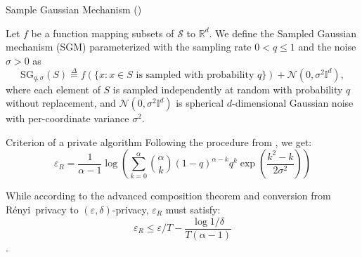 \documentclass{beamer}
\newcommand{\eqdef}{\stackrel{\Delta}{=}}
\newcommand{\SG}{\mathrm{SG}}
\newcommand{\renyi}{R\'enyi}
\newcommand{\eps}{\varepsilon}
\begin{document}
\begin{frame}{Sample Gaussian Mechanism (\cite{mironov2019SGM})}
    \begin{definition} Let $f$ be a function mapping subsets of $\mathcal{S}$ to $\mathbb{R}^d$. We define the Sampled Gaussian mechanism (SGM) parameterized with the sampling rate $0<q\leq 1$ and the noise $\sigma>0$ as
        \[
        \SG_{q,\sigma}(S)\eqdef f(\{x\colon x\in S \textrm{ is sampled with probability } q\})+\mathcal{N}(0,\sigma^2\mathbb{I}^d),
        \]
    where each element of $S$ is sampled independently at random with probability $q$ without replacement, and $\mathcal{N}(0,\sigma^2\mathbb{I}^d)$ is spherical $d$-dimensional Gaussian noise with per-coordinate variance $\sigma^2$.
    \end{definition}
    
    \end{frame}
\begin{frame}{Criterion of a private algorithm}
Following the procedure from \cite{mironov2019SGM}, we get:
$$\eps_R = \frac{1}{\alpha - 1} \log\left(\sum_{k=0}^{\alpha} {\alpha \choose k}  (1-q)^{\alpha-k}q^{k} \exp\left(\frac{k^2 - k}{2\sigma^2}\right)\right)$$

While according to the advanced composition theorem and conversion from \renyi\ privacy to $(\eps, \delta)$-privacy, $\eps_R$ must satisfy:
$$ \eps_R \leq \eps/T - \frac{\log 1/\delta}{T(\alpha - 1)}$$.
\end{frame}
\end{document}
